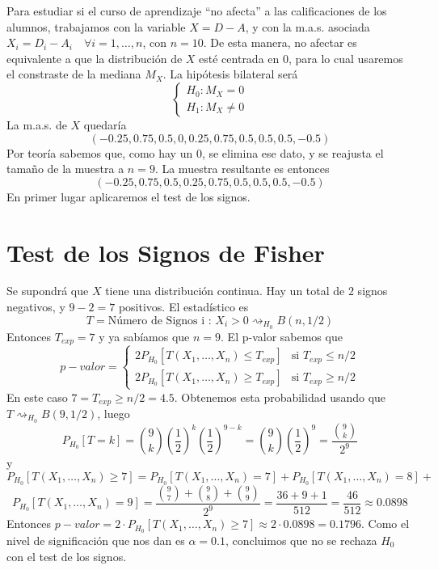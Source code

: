 \documentclass[12pt]{article}
\begin{document}
\begin{ejercicio}[1,1 puntos]
        Para estudiar si el curso de aprendizaje ``no afecta'' a las calificaciones de los alumnos,
        trabajamos con la variable $X = D-A$, y con la m.a.s. asociada $X_i = D_i - A_i \quad \forall i = 1, \ldots, n$, 
        con $n=10$. De esta manera, no afectar es equivalente a que la distribución de $X$ esté centrada en $0$,
        para lo cual usaremos el constraste de la mediana $M_X$. La hipótesis bilateral será
        $$\begin{cases}
            H_0 : M_X = 0 \\
            H_1 : M_X \neq 0
        \end{cases}$$
        La m.a.s. de $X$ quedaría $$(-0{.}25, 0{.}75, 0{.}5,0,0{.}25,{0.75},0{.}5,0{.}5, 0{.}5, -0{.}5)$$ Por teoría 
        sabemos que, como hay un $0$, se elimina ese dato, y se reajusta el tamaño de la muestra a $n=9$. La muestra
        resultante es entonces $$(-0{.}25, 0{.}75, 0{.}5,0{.}25,0{.}75,0{.}5,0{.}5, 0{.}5, -0{.}5)$$
        En primer lugar aplicaremos el test de los signos. 
        \section*{Test de los Signos de Fisher}
        Se supondrá que $X$ tiene una distribución continua. Hay un total de $2$ signos negativos, y $9-2 = 7$ positivos. El estadístico es 
        $$T = \text{Número de Signos i : } X_i > 0 \rightsquigarrow_{H_0} B(n,1/2)$$ 
        Entonces $T_{exp} = 7$ y ya sabíamos que $n=9$. El p-valor sabemos que
        $$p-valor = \begin{cases}
            2 P_{H_0}[T(X_1, \ldots, X_n) \leqslant T_{exp}] &\text{si } T_{exp} \leqslant n/2 \\
            2 P_{H_0}[T(X_1, \ldots, X_n) \geqslant T_{exp}] &\text{si } T_{exp} \geqslant n/2
        \end{cases}$$
        En este caso $7 = T_{exp} \geqslant n/2 = 4.5$. Obtenemos esta probabilidad usando que $T \rightsquigarrow_{H_0}
        B(9,1/2)$, luego $$P_{H_0}[T=k] = \binom{9}{k} \left( \dfrac{1}{2} \right)^k \left( \dfrac{1}{2} \right)^{9-k} 
        = \binom{9}{k} \left( \dfrac{1}{2} \right)^9 = \dfrac{\binom{9}{k}}{2^9}$$
        y
        $$P_{H_0}[T(X_1, \ldots, X_n) \geqslant 7] = P_{H_0}[T(X_1, \ldots, X_n) = 7] + 
        P_{H_0}[T(X_1, \ldots, X_n) = 8] + $$$$P_{H_0}[T(X_1, \ldots, X_n) = 9] = 
        \dfrac{\binom{9}{7} + \binom{9}{8} + \binom{9}{9}}{2^9} = \dfrac{36 + 9 + 1}{512} = \dfrac{46}{512} \approx 0.0898$$
        Entonces $p-valor = 2 \cdot P_{H_0}[T(X_1, \ldots, X_n) \geqslant 7] \approx 2 \cdot 0.0898 = 0.1796$.
        Como el nivel de significación que nos dan es $\alpha = 0.1$, concluimos que no se rechaza $H_0$ con el test
        de los signos.

\end{ejercicio}
\end{document}
